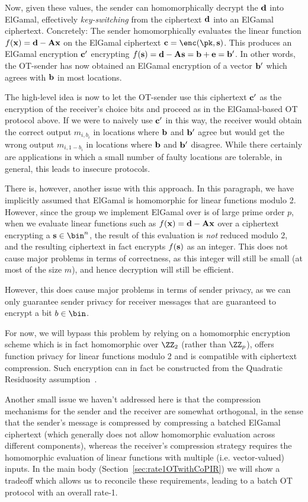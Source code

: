 Now, given these values, the sender can homomorphically decrypt the $\mathbf{d}$ into ElGamal, effectively \emph{key-switching} from the ciphertext $\mathbf{d}$ into an ElGamal ciphertext. Concretely: The sender homomorphically evaluates the linear function $f(\mathbf{x}) = \mathbf{d} - \mathbf{A}\mathbf{x}$ on the ElGamal ciphertext $\vc{c} = \enc(\pk,\vc{s})$. This produces an ElGamal encryption $\mathbf{c}'$ encrypting $f(\mathbf{s}) = \mathbf{d} - \mathbf{A}\mathbf{s} = \mathbf{b} + \mathbf{e} = \mathbf{b}'$. In other words, the OT-sender has now obtained an ElGamal encryption of a vector $\mathbf{b}'$ which agrees with $\mathbf{b}$ in most locations.

The high-level idea is now to let the OT-sender use this ciphertext $\mathbf{c}'$ as the encryption of the receiver's choice bits and proceed as in the ElGamal-based OT protocol above. If we were to naively use $\mathbf{c}'$ in this way, the receiver would obtain the correct output $m_{i,b_i}$ in locations where $\mathbf{b}$ and $\mathbf{b}'$ agree but would get the wrong output $m_{i,1-b_i}$ in locations where $\mathbf{b}$ and $\mathbf{b}'$ disagree. While there certainly are applications in which a small number of faulty locations are tolerable, in general, this leads to insecure protocols.

There is, however, another issue with this approach. In this paragraph, we have implicitly assumed that ElGamal is homomorphic for linear functions modulo 2. However, since the group we implement ElGamal over is of large prime order $p$, when we evaluate linear functions such as $f(\mathbf{x}) = \mathbf{d} - \mathbf{A}\mathbf{x}$ over a ciphertext encrypting a $\vc{s} \in \bin^n$, the result of this evaluation is \emph{not} reduced modulo 2, and the resulting ciphertext in fact encrypts $f(\mathbf{s})$ as an integer. This does not cause major problems in terms of correctness, as this integer will still be small (at most of the size $m$), and hence decryption will still be efficient.

However, this does cause major problems in terms of sender privacy, as we can only guarantee sender privacy for receiver messages that are guaranteed to encrypt a bit $b \in \bin$.

For now, we will bypass this problem by relying on a homomorphic encryption scheme which is in fact homomorphic over $\ZZ_2$ (rather than $\ZZ_p$), offers function privacy for linear functions modulo 2 and is compatible with ciphertext compression. Such encryption can in fact be constructed from the Quadratic Residuosity assumption~\cite{C:DGIMMO19}.

Another small issue we haven't addressed here is that the compression mechanisms for the sender and the receiver are somewhat orthogonal, in the sense that the sender's message is compressed by compressing a batched ElGamal ciphertext (which generally does not allow homomorphic evaluation across different components), whereas the receiver's compression strategy requires the homomorphic evaluation of linear functions with multiple (i.e. vector-valued) inputs. In the main body (Section~\ref{sec:rate1OTwithCoPIR}) we will show a tradeoff which allows us to reconcile these requirements, leading to a batch OT protocol with an overall rate-1.


